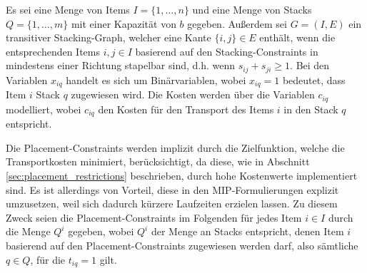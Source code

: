 Es sei eine Menge von Items $I = \{1, \dotsc, n\}$ und eine Menge von Stacks $Q = \{1, \dotsc, m\}$ mit einer Kapazität von $b$ gegeben. Außerdem sei $G = (I, E)$ ein transitiver Stacking-Graph, welcher eine Kante $\{i, j\} \in E$ enthält,
wenn die entsprechenden Items $i, j \in I$ basierend auf den Stacking-Constraints in mindestens einer Richtung stapelbar sind,
d.h. wenn $s_{ij} + s_{ji} \geq 1$.
Bei den Variablen $x_{iq}$ handelt es sich um Binärvariablen, wobei $x_{iq} = 1$ bedeutet, dass Item $i$ Stack $q$ zugewiesen wird. Die Kosten werden über die Variablen $c_{iq}$ modelliert, wobei $c_{iq}$ den Kosten für den Transport des Items $i$ in den Stack $q$ entspricht.

Die Placement-Constraints werden implizit durch die Zielfunktion, welche die Transportkosten minimiert, berücksichtigt,
da diese, wie in Abschnitt \ref{sec:placement_restrictions} beschrieben, durch hohe Kostenwerte implementiert sind.
Es ist allerdings von Vorteil, diese in den MIP-Formulierungen explizit umzusetzen, weil sich dadurch kürzere
Laufzeiten erzielen lassen. Zu diesem Zweck seien die Placement-Constraints im Folgenden für jedes Item $i \in I$
durch die Menge $Q^i$ gegeben, wobei $Q^i$ der Menge an Stacks entspricht, denen Item $i$ basierend auf den Placement-Constraints zugewiesen werden darf, also sämtliche $q \in Q$, für die $t_{iq} = 1$ gilt.



